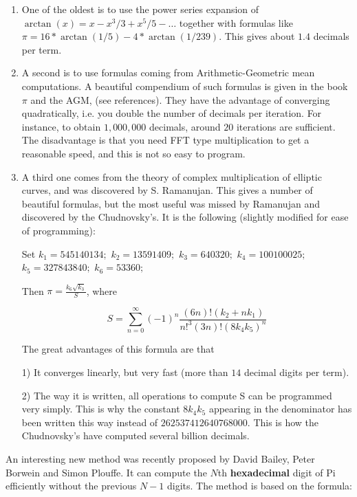 \begin{enumerate}

  \item One of the oldest is to use the power series expansion of
  $\arctan(x)=x-x^3/3+x^5/5-\ldots$ together with formulas like
  $\pi=16*\arctan(1/5)-4*\arctan(1/239)$. This gives about $1.4$ decimals per
  term.

  \item A second is to use formulas coming from Arithmetic-Geometric
  mean computations. A beautiful compendium of such formulas is given in
  the book $\pi$ and the AGM, (see references).  They have the advantage
  of converging quadratically, i.e. you double the number of decimals
  per iteration.  For instance, to obtain $1,000,000$ decimals, around
  $20$ iterations are sufficient. The disadvantage is that you need FFT
  type multiplication to get a reasonable speed, and this is not so easy
  to program.

  \item A third one comes from the theory of complex multiplication of
  elliptic curves, and was discovered by S. Ramanujan. This gives a
  number of beautiful formulas, but the most useful was missed by
  Ramanujan and discovered by the Chudnovsky's. It is the following
  (slightly modified for ease of programming):

  Set $k_1=545140134;$ $k_2=13591409;$ $k_3=640320;$ $k_4=100100025;$
  $k_5=327843840;$ $k_6=53360;$

  Then $\pi=\frac{k_6\sqrt{k_3}}{S}$, where

  \[S=\sum_{n=0}^\infty
  (-1)^n\frac{(6n)!(k_2+nk_1)}{n!^3(3n)!(8k_4k_5)^n}\]

  The great advantages of this formula are that

  1) It converges linearly, but very fast (more than $14$ decimal digits
  per term).

  2) The way it is written, all operations to compute S can be
  programmed very simply. This is why the constant $8k_4k_5$ appearing
  in the denominator has been written this way instead of
  $262537412640768000$.  This is how the Chudnovsky's have computed
  several billion decimals.
\end{enumerate}


%
An interesting new method was recently proposed by David Bailey, Peter
Borwein and Simon Plouffe. It can compute the $N$th {\bf hexadecimal}
digit of Pi efficiently without the previous $N-1$ digits. The method is
based on the formula:

